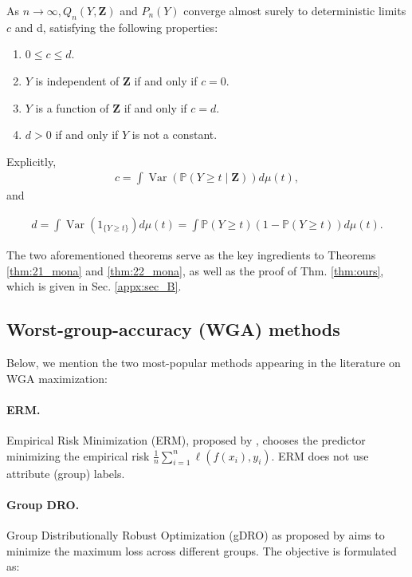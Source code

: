 \begin{theorem}\citep{azadkia2021simple}
\label{thm:92_mona}
As $n \rightarrow \infty, Q_n(Y, \mathbf{Z})$ and $P_n(Y)$ converge almost surely to deterministic limits $c$ and d, satisfying the following properties:
\begin{enumerate}
	\item $0 \leq c \leq d$.
	\item $Y$ is independent of $\mathbf{Z}$ if and only if $c=0$.
	\item $Y$ is a function of $\mathbf{Z}$ if and only if $c=d$.
	\item $d>0$ if and only if $Y$ is not a constant.
\end{enumerate}

Explicitly,
\begin{align*}
c=\int \operatorname{Var}(\mathbb{P}(Y \geq t \mid \mathbf{Z})) d \mu(t),
\end{align*}
and

\begin{align*}
d  =\int \operatorname{Var}\left(1_{\{Y \geq t\}}\right) d \mu(t)  =\int \mathbb{P}(Y \geq t)(1-\mathbb{P}(Y \geq t)) d \mu(t).
\end{align*}
\end{theorem}

The two aforementioned theorems serve as the key ingredients to Theorems \ref{thm:21_mona} and \ref{thm:22_mona}, as well as the proof of Thm. \ref{thm:ours}, which is given in Sec. \ref{appx:sec_B}.

\subsection{Worst-group-accuracy (WGA) methods}
\label{appx:sec_A2}
Below, we mention the two most-popular methods appearing in the literature on WGA maximization:

\paragraph{ERM.} Empirical Risk Minimization (ERM), proposed by \citet{vapnik2006estimation}, chooses the predictor minimizing the empirical risk $\frac{1}{n} \sum_{i=1}^n \ell\left(f\left(x_i\right), y_i\right)$. ERM does not use attribute (group) labels.


\paragraph{Group DRO.} Group Distributionally Robust Optimization (gDRO) as proposed by \citet{sagawa2019distributionally} aims to minimize the maximum loss across different groups. The objective is formulated as: 

